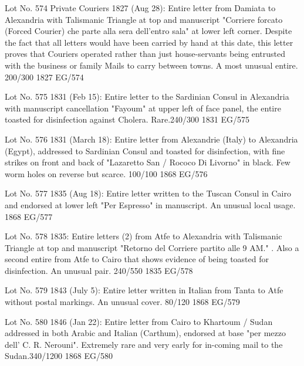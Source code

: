 \documentclass[justified]{tufte-book}
\begin{document}
%
{Lot No. 574
Private Couriers 1827 (Aug 28): Entire letter from Damiata to Alexandria with Talismanic Triangle at top and manuscript "Corriere forcato (Forced Courier) che parte alla sera dell'entro sala" at lower left corner. Despite the fact that all letters would have been carried by hand at this date, this letter proves that Couriers operated rather than just house-servants being entrusted with the business or family Mails to carry between towns. A most unusual entire. 200/300 }%
{1827}%
{EG/574}%
{}%
{}
{}%
{}


%
{Lot No. 575
1831 (Feb 15): Entire letter to the Sardinian Consul in Alexandria with manuscript cancellation "Fayoum" at upper left of face panel, the entire toasted for disinfection against Cholera. Rare.240/300
}%
{1831}%
{EG/575}%
{}%
{}
{}%
{}

%
{Lot No. 576
1831 (March 18): Entire letter from Alexandrie (Italy) to Alexandria (Egypt), addressed to Sardinian Consul and toasted for disinfection, with fine strikes on front and back of "Lazaretto San / Rococo Di Livorno" in black. Few worm holes on reverse but scarce.  100/100}%
{1868}%
{EG/576}%
{}%
{}
{}%
{}

%
{Lot No. 577
1835 (Aug 18): Entire letter written to the Tuscan Consul in Cairo and endorsed at lower left "Per Espresso" in manuscript. An unusual local usage.}%
{1868}%
{EG/577}%
{}%
{}
{}%
{}

%
{Lot No. 578
1835: Entire letters (2) from Atfe to Alexandria with Talismanic Triangle at top and manuscript "Retorno del Corriere partito alle 9 AM." . Also a second entire from Atfe to Cairo that shows evidence of being toasted for disinfection. An unusual pair. 240/550}%
{1835}%
{EG/578}%
{}%
{}
{}%
{}

%
{Lot No. 579
1843 (July 5): Entire letter written in Italian from Tanta to Atfe without postal markings. An unusual cover. 80/120}%
{1868}%
{EG/579}%
{}%
{}
{}%
{}

%
{Lot No. 580
1846 (Jan 22): Entire letter from Cairo to Khartoum / Sudan addressed in both Arabic and Italian (Carthum), endorsed at base "per mezzo dell' C. R. Nerouni". Extremely rare and very early for in-coming mail to the Sudan.340/1200 }%
{1868}%
{EG/580}%
{}%
{}
{}%
{}
\end{document}
